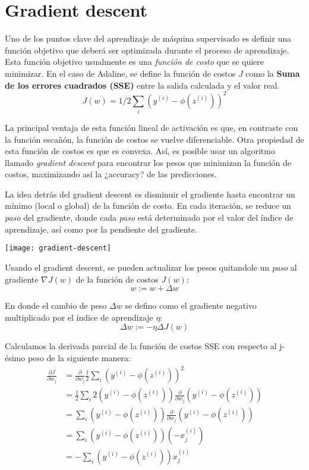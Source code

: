 \section{Gradient descent}
Uno de los puntos clave del aprendizaje de máquina supervisado es
definir una función objetivo que deberá ser optimizada durante el
proceso de aprendizaje. Esta función objetivo usualmente es una
\textit{función de costo} que se quiere minimizar. En el caso de
Adaline, se define la función de costos $J$ como la \textbf{Suma de
  los errores cuadrados (SSE)} entre la salida calculada y el valor
real.
\begin{equation}
  J(w)=1/2 \sum_i (y^{(i)} - \phi (z^{(i)}))^2
\end{equation}

La principal ventaja de esta función lineal de activación es que,
en contraste con la función escañón, la función de costos se vuelve
diferenciable. Otra propiedad de esta función de costos es que es
convexa. Así, es posible usar un algoritmo llamado \textit{gradient descent}
para encontrar los pesos que minimizan la función de costos, maximizando así
la ¿accuracy? de las predicciones.

La idea detrás del gradient descent es disminuir el gradiente hasta encontrar
un mínimo (local o global) de la función de costo. En cada iteración, se reduce
un \textit{paso} del gradiente, donde cada \textit{paso} está determinado por
el valor del índice de aprendizaje, así como por la pendiente del gradiente.

\texttt{[image: gradient-descent]}

Usando el gradient descent, se pueden actualizar los pesos quitandole un \textit{paso}
al gradiente $\nabla J(w)$ de la función de costos $J(w)$:
\begin{equation}
  w := w + \Delta w
\end{equation}

En donde el cambio de peso $\Delta w$ se defino como el gradiente negativo multiplicado
por el índice de aprendizaje $\eta$:
\begin{equation}
  \Delta w := -\eta \Delta J(w)
\end{equation}

Calculamos la derivada parcial de la función de costos SSE con respecto al
j-ésimo peso de la siguiente manera:
\begin{equation*}
\begin{split}
  \frac{\partial J}{\partial w_j} &= \frac{\partial}{\partial w_j}\frac{1}{2}\sum_i (y^{(i)} - \phi(z^{(i)}))^2 \\
  &= \frac{1}{2}\sum_i 2(y^{(i)} - \phi(z^{(i)}))\frac{\partial}{\partial w_j}(y^{(i)} - \phi(z^{(i)}))\\
  &= \sum_i (y^{(i)} - \phi(z^{(i)}))\frac{\partial}{\partial w_j}(y^{(i)} - \phi (z^{(i)}))\\
  &= \sum_i(y^{(i)} - \phi(z^{(i)}))(-x_j^{(i)})\\
  &= -\sum_i(y^{(i)} - \phi(z^{(i)}))x_j^{(i)}
\end{split}
\end{equation*}

